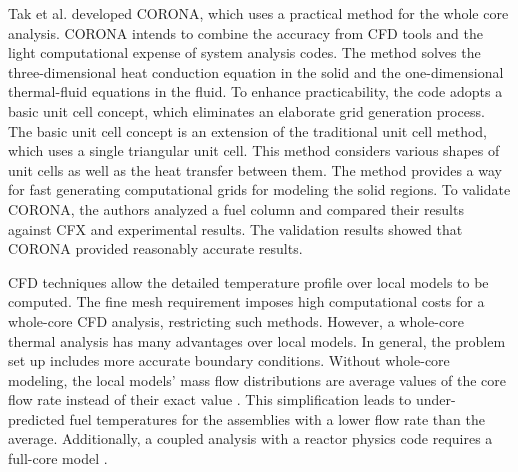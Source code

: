 Tak et al. \cite{tak_practical_2012} \cite{tak_development_2014} developed CORONA, which uses a practical method for the whole core analysis.
CORONA intends to combine the accuracy from CFD tools and the light computational expense of system analysis codes.
The method solves the three-dimensional heat conduction equation in the solid and the one-dimensional thermal-fluid equations in the fluid.
To enhance practicability, the code adopts a basic unit cell concept, which eliminates an elaborate grid generation process.
The basic unit cell concept is an extension of the traditional unit cell method, which uses a single triangular unit cell.
This method considers various shapes of unit cells as well as the heat transfer between them.
The method provides a way for fast generating computational grids for modeling the solid regions.
To validate CORONA, the authors analyzed a fuel column and compared their results against CFX and experimental results.
The validation results showed that CORONA provided reasonably accurate results.

CFD techniques allow the detailed temperature profile over local models to be computed.
The fine mesh requirement imposes high computational costs for a whole-core CFD analysis, restricting such methods.
However, a whole-core thermal analysis has many advantages over local models.
In general, the problem set up includes more accurate boundary conditions.
Without whole-core modeling, the local models' mass flow distributions are average values of the core flow rate instead of their exact value \cite{huning_novel_2016}.
This simplification leads to under-predicted fuel temperatures for the assemblies with a lower flow rate than the average.
Additionally, a coupled analysis with a reactor physics code requires a full-core model \cite{tak_practical_2012}.


